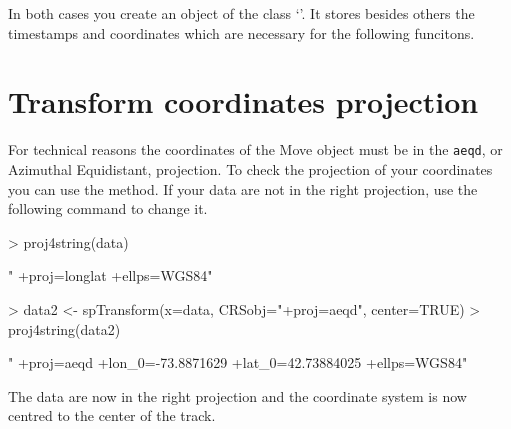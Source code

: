 \documentclass[article,nojss]{jss}
\newcommand{\fct}[1]{{\code{#1()}}}
\newcommand{\class}[1]{{`\code{#1}'}}
\begin{document}
\begin{Schunk}
\end{Schunk}

In both cases you create an object of the class \class{Move}. It stores besides others the timestamps and coordinates which are necessary for the following funcitons. 

\section*{Transform coordinates projection}
For technical reasons the coordinates of the Move object must be in the \texttt{aeqd}, or Azimuthal Equidistant, projection. To check the projection of your coordinates you can use the \fct{proj4string} method. If your data are not in the right projection, use the following command to change it. 

\begin{Schunk}
\begin{Sinput}
> proj4string(data)
\end{Sinput}
\begin{Soutput}
[1] " +proj=longlat +ellps=WGS84"
\end{Soutput}
\begin{Sinput}
> data2 <- spTransform(x=data, CRSobj="+proj=aeqd", center=TRUE)  
> proj4string(data2)
\end{Sinput}
\begin{Soutput}
[1] " +proj=aeqd +lon_0=-73.8871629 +lat_0=42.73884025 +ellps=WGS84"
\end{Soutput}
\end{Schunk}
The data are now in the right projection and the coordinate system is now centred to the center of the track. 

\end{document}
